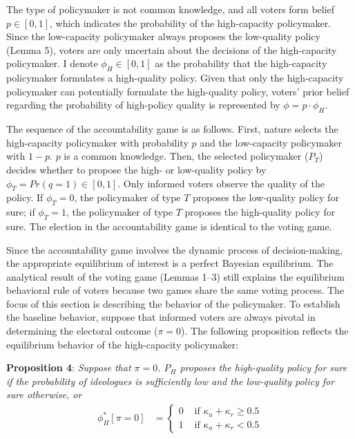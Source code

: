 \documentclass[letterpaper, 12pt]{article}
\begin{document}
    \par The type of policymaker is not common knowledge, and all voters form belief $p \in [0, 1]$, which indicates the probability of the high-capacity policymaker. Since the low-capacity policymaker always proposes the low-quality policy (Lemma 5), voters are only uncertain about the decisions of the high-capacity policymaker. I denote $\phi_H \in [0,1]$ as the probability that the high-capacity policymaker formulates a high-quality policy. Given that only the high-capacity policymaker can potentially formulate the high-quality policy, voters' prior belief regarding the probability of high-policy quality is represented by $\phi = p \cdot \phi_H$. 
    
    \par The sequence of the accountability game is as follows. First, nature selects the high-capacity policymaker with probability $p$ and the low-capacity policymaker with $1-p$. $p$ is a common knowledge. Then, the selected policymaker ($P_T$) decides whether to propose the high- or low-quality policy by $\phi_T = Pr(q=1) \in [0, 1]$. Only informed voters observe the quality of the policy. If $\phi_T = 0$, the policymaker of type $T$ proposes the low-quality policy for sure; if $\phi_T = 1$, the policymaker of type $T$ proposes the high-quality policy for sure. The election in the accountability game is identical to the voting game. 
    
    \par Since the accountability game involves the dynamic process of decision-making, the appropriate equilibrium of interest is a perfect Bayesian equilibrium. The analytical result of the voting game (Lemmas 1--3) still explains the equilibrium behavioral rule of voters because two games share the same voting process. The focus of this section is describing the behavior of the policymaker. To establish the baseline behavior, suppose that informed voters are always pivotal in determining the electoral outcome ($\pi=0$). The following proposition reflects the equilibrium behavior of the high-capacity policymaker:
    
    \noindent \textbf{Proposition 4}: \textit{Suppose that $\pi=0$. $P_H$ proposes the high-quality policy for sure if the probability of ideologues is sufficiently low and the low-quality policy for sure otherwise, or}
    \begin{align}
    \phi^*_H[\pi=0] &=
    \begin{cases}
    0 &\text{ if }  \kappa_{a} + \kappa_{r} \geq 0.5 \\
    1 &\text{ if }  \kappa_{a} + \kappa_{r} < 0.5
    \end{cases}
    \end{align}
    
\end{document}

